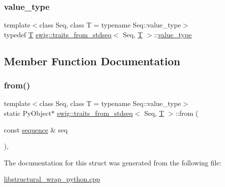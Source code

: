 \mbox{\label{structswig_1_1traits__from__stdseq_a2159701c1eaadbf75d9b3014fea48706}} 
\subsubsection{\texorpdfstring{value\+\_\+type}{value\_type}}
{\footnotesize\ttfamily template$<$class Seq, class T = typename Seq\+::value\+\_\+type$>$ \\
typedef \hyperlink{fmt_8h_a0acb682b8260ab1c60b918599864e2e5}{T} \hyperlink{structswig_1_1traits__from__stdseq}{swig\+::traits\+\_\+from\+\_\+stdseq}$<$ Seq, \hyperlink{fmt_8h_a0acb682b8260ab1c60b918599864e2e5}{T} $>$\+::\hyperlink{structswig_1_1traits__from__stdseq_a2159701c1eaadbf75d9b3014fea48706}{value\+\_\+type}}



\subsection{Member Function Documentation}
\mbox{\label{structswig_1_1traits__from__stdseq_ab65e9ff3dbb76a137536483c6121584b}} 
\subsubsection{\texorpdfstring{from()}{from()}}
{\footnotesize\ttfamily template$<$class Seq, class T = typename Seq\+::value\+\_\+type$>$ \\
static Py\+Object$\ast$ \hyperlink{structswig_1_1traits__from__stdseq}{swig\+::traits\+\_\+from\+\_\+stdseq}$<$ Seq, \hyperlink{fmt_8h_a0acb682b8260ab1c60b918599864e2e5}{T} $>$\+::from (\begin{DoxyParamCaption}\item[{const \hyperlink{structswig_1_1traits__from__stdseq_ad784f89c80055794b0da097a644ab7ab}{sequence} \&}]{seq }\end{DoxyParamCaption})\hspace{0.3cm}{\ttfamily [inline]}, {\ttfamily [static]}}



The documentation for this struct was generated from the following file\+:\begin{DoxyCompactItemize}
\item 
\hyperlink{libstructural__wrap__python_8cpp}{libstructural\+\_\+wrap\+\_\+python.\+cpp}\end{DoxyCompactItemize}

